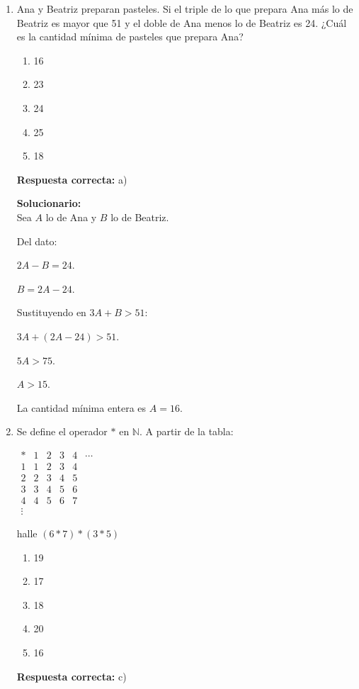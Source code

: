 \begin{enumerate}
	\vspace{6mm}
	
	\item Ana y Beatriz preparan pasteles. Si el triple de lo que prepara Ana más lo de Beatriz es mayor que 51 y el doble de Ana menos lo de Beatriz es 24. ¿Cuál es la cantidad mínima de pasteles que prepara Ana?
	\begin{enumerate}[label=\alph*)]
		\item 16
		\item 23
		\item 24
		\item 25
		\item 18
	\end{enumerate}
	\textbf{Respuesta correcta:} a)
	
	\vspace{2mm}
	\textbf{Solucionario:}\\
	Sea $A$ lo de Ana y $B$ lo de Beatriz.
	
	Del dato:
	
	$2A-B=24$.
	
	$B=2A-24$.
	
	Sustituyendo en $3A+B>51$:
	
	$3A+(2A-24)>51$.
	
	$5A>75$.
	
	$A>15$.
	
	La cantidad mínima entera es $A=16$.
	
	
	\vspace{6mm}
	
	\item Se define el operador $*$ en $\mathbb{N}$.
	A partir de la tabla:
	
	$
	\begin{array}{c|cccccc}
		* & 1 & 2 & 3 & 4 & \cdots \\
		\hline
		1 & 1 & 2 & 3 & 4 & \\
		2 & 2 & 3 & 4 & 5 & \\
		3 & 3 & 4 & 5 & 6 & \\
		4 & 4 & 5 & 6 & 7 & \\
		\vdots & & & & & &
	\end{array}
	$
	
	halle $(6*7)*(3*5)$
	\begin{enumerate}[label=\alph*)]
		\item 19
		\item 17
		\item 18
		\item 20
		\item 16
	\end{enumerate}
	\textbf{Respuesta correcta:} c)
	

\end{enumerate}
